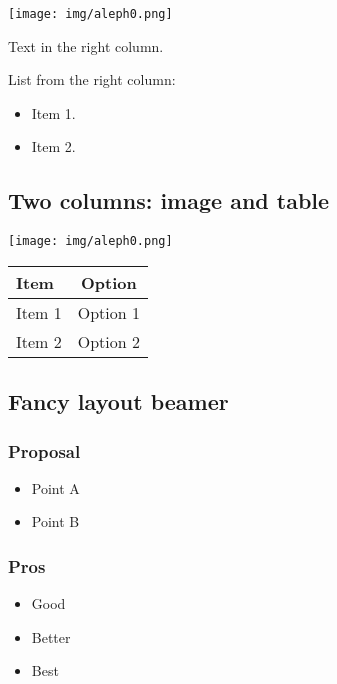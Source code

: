 \documentclass[
  11pt,
  ignorenonframetext,
]{article}
\providecommand{\tightlist}{%
  \setlength{\itemsep}{0pt}\setlength{\parskip}{0pt}}
\begin{document}
\texttt{[image: img/aleph0.png]}

Text in the right column.

List from the right column:

\begin{itemize}
\tightlist
\item
  Item 1.
\item
  Item 2.
\end{itemize}

\subsection{Two columns: image and
table}\label{two-columns-image-and-table}

\texttt{[image: img/aleph0.png]}

\begin{longtable}[]{@{}lc@{}}
\toprule\noalign{}
\textbf{Item} & \textbf{Option} \\
\midrule\noalign{}
\endhead
\bottomrule\noalign{}
\endlastfoot
Item 1 & Option 1 \\
Item 2 & Option 2 \\
\end{longtable}

\subsection{Fancy layout beamer}\label{fancy-layout-beamer}

\subsubsection{Proposal}\label{proposal}

\begin{itemize}
\tightlist
\item
  Point A
\item
  Point B
\end{itemize}

\subsubsection{Pros}\label{pros}

\begin{itemize}
\tightlist
\item
  Good
\item
  Better
\item
  Best
\end{itemize}
\end{document}

